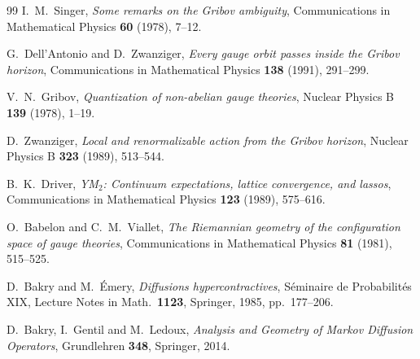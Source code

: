 \documentclass[11pt,a4paper]{amsart}
\theoremstyle{definition}
\begin{document}
\begin{thebibliography}{99}
I.~M.~Singer,
\emph{Some remarks on the Gribov ambiguity},
Communications in Mathematical Physics \textbf{60} (1978), 7--12.

G.~Dell'Antonio and D.~Zwanziger,
\emph{Every gauge orbit passes inside the Gribov horizon},
Communications in Mathematical Physics \textbf{138} (1991), 291--299.

V.~N.~Gribov,
\emph{Quantization of non-abelian gauge theories},
Nuclear Physics B \textbf{139} (1978), 1--19.

D.~Zwanziger,
\emph{Local and renormalizable action from the Gribov horizon},
Nuclear Physics B \textbf{323} (1989), 513--544.

B.~K.~Driver,
\emph{YM$_2$: Continuum expectations, lattice convergence, and lassos},
Communications in Mathematical Physics \textbf{123} (1989), 575--616.

O.~Babelon and C.~M.~Viallet,
\emph{The Riemannian geometry of the configuration space of gauge theories},
Communications in Mathematical Physics \textbf{81} (1981), 515--525.

D.~Bakry and M.~\'Emery,
\emph{Diffusions hypercontractives},
S\'eminaire de Probabilit\'es XIX, Lecture Notes in Math.\ \textbf{1123},
Springer, 1985, pp.~177--206.

D.~Bakry, I.~Gentil and M.~Ledoux,
\emph{Analysis and Geometry of Markov Diffusion Operators},
Grundlehren \textbf{348}, Springer, 2014.

\end{thebibliography}
\end{document}
